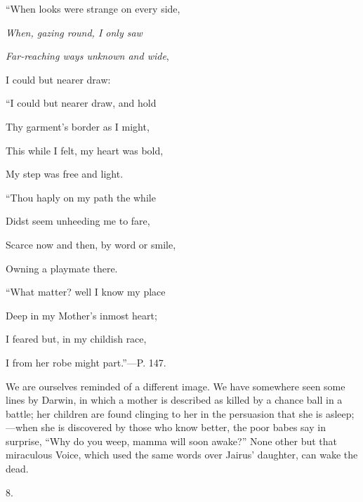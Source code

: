 ``When
looks were strange on every side,

\emph{When, gazing round, I only saw}

\emph{Far-reaching ways unknown and wide},

I could but nearer draw:

``I could
but nearer draw, and hold

Thy garment's border as I might,

This while I felt, my heart was bold,

My step was free and light.

``Thou
haply on my path the while

Didst seem unheeding me to fare,

Scarce now and then, by word or smile,

Owning a playmate there.

``What
matter? well I know my place

Deep in my Mother's inmost heart;

I feared but, in my childish race,

I from her robe might part.''—P. 147.

We are ourselves reminded of a different image.
We have somewhere seen some lines by Darwin, in which a mother is
described as killed by a chance ball in a battle; her children are
found clinging to her in the persuasion that she is asleep;—when she
is discovered by those who know better, the poor babes say in
surprise, ``Why do you weep, mamma will soon awake?'' None other but
that miraculous Voice, which used the same words over Jairus'
daughter, can wake the dead.

8.


